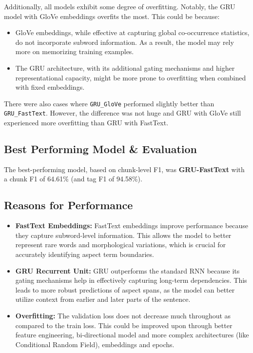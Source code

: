 \documentclass{article}
\begin{document}
Additionally, all models exhibit some degree of overfitting. Notably, the GRU model with GloVe embeddings overfits the most. This could be because:
\begin{itemize}
    \item GloVe embeddings, while effective at capturing global co-occurrence statistics, do not incorporate subword information. As a result, the model may rely more on memorizing training examples.
    \item The GRU architecture, with its additional gating mechanisms and higher representational capacity, might be more prone to overfitting when combined with fixed embeddings.
\end{itemize}

There were also cases where \texttt{GRU\_GloVe} performed slightly better than \texttt{GRU\_FastText}. However, the difference was not huge and GRU with GloVe still experienced more overfitting than GRU with FastText. 

\subsection{Best Performing Model \& Evaluation}
The best-performing model, based on chunk-level F1, was \textbf{GRU-FastText} with a chunk F1 of 64.61\% (and tag F1 of 94.58\%). 

\subsection{Reasons for Performance}
\begin{itemize}
    \item \textbf{FastText Embeddings:} FastText embeddings improve performance because they capture subword-level information. This allows the model to better represent rare words and morphological variations, which is crucial for accurately identifying aspect term boundaries.
    \item \textbf{GRU Recurrent Unit:} GRU outperforms the standard RNN because its gating mechanisms help in effectively capturing long-term dependencies. This leads to more robust predictions of aspect spans, as the model can better utilize context from earlier and later parts of the sentence.
    \item \textbf{Overfitting:} The validation loss does not decrease much throughout as compared to the train loss. This could be improved upon through better feature engineering, bi-directional model and more complex architectures (like Conditional Random Field), embeddings and epochs.
\end{itemize}
\end{document}

